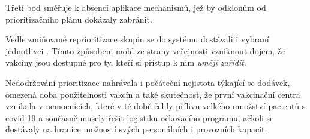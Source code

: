 Třetí bod směřuje k absenci aplikace mechanismů, jež by odklonům od prioritizačního plánu dokázaly zabránit.

Vedle zmiňované reprioritizace skupin se do systému dostávali i vybraní jednotlivci \cite{logoc_namestkyne, logoc_kabatek, CTK2021JsemDenik, logo_hejtman, logo_predbihani}.
Tímto způsobem mohl ze strany veřejnosti vzniknout dojem, že vakcíny jsou dostupné pro ty, kteří si přístup k nim \emph{umějí zařídit}. 

Nedodržování prioritizace nahrávala i počáteční nejistota týkající se dodávek, omezená doba použitelnosti vakcín a také skutečnost, že první vakcinační centra vznikala v nemocnicích, které v té době čelily přílivu velkého množství pacientů s covid-19 a současně musely řešit logistiku očkovacího programu, ačkoli se dostávaly na hranice možností svých personálních i provozních kapacit. 


 
